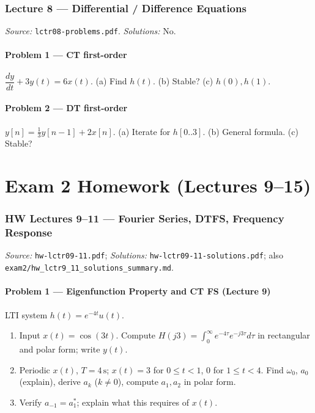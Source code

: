 \documentclass[11pt]{article}
\begin{document}
\section{Lecture 8 --- Differential / Difference Equations}
\emph{Source:} \texttt{lctr08-problems.pdf}. \emph{Solutions:} No.

\subsection{Problem 1 --- CT first-order}
$\dfrac{dy}{dt} + 3y(t) = 6x(t)$. (a) Find $h(t)$. (b) Stable? (c) $h(0),h(1)$.

\subsection{Problem 2 --- DT first-order}
$y[n] = \tfrac{1}{3}y[n-1] + 2x[n]$. (a) Iterate for $h[0..3]$. (b) General formula. (c) Stable?

\newpage
\part{Exam 2 Homework (Lectures 9--15)}

\section{HW Lectures 9--11 --- Fourier Series, DTFS, Frequency Response}
\emph{Source:} \texttt{hw-lctr09-11.pdf}; \emph{Solutions:} \texttt{hw-lctr09-11-solutions.pdf}; also \texttt{exam2/hw\_lctr9\_11\_solutions\_summary.md}.

\subsection{Problem 1 --- Eigenfunction Property and CT FS (Lecture 9)}
LTI system $h(t)=e^{-4t}u(t)$.
\begin{enumerate}[label=(\alph*)]
  \item Input $x(t)=\cos(3t)$. Compute $H(j3) = \int_0^\infty e^{-4\tau}e^{-j3\tau}d\tau$ in rectangular and polar form; write $y(t)$.
  \item Periodic $x(t)$, $T=4\,\text{s}$; $x(t)=3$ for $0\le t<1$, $0$ for $1\le t<4$. Find $\omega_0$, $a_0$ (explain), derive $a_k$ ($k\neq 0$), compute $a_1,a_2$ in polar form.
  \item Verify $a_{-1}=a_1^*$; explain what this requires of $x(t)$.
\end{enumerate}
\end{document}
